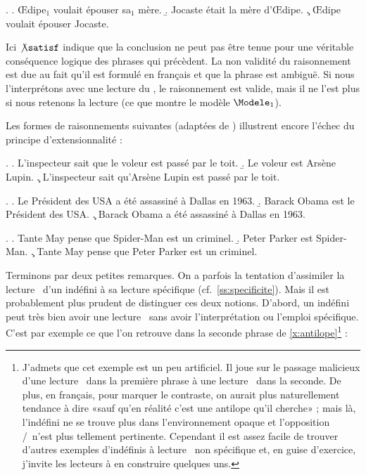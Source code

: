 \ex.
\a. \OE dipe$_1$  voulait épouser sa$_1$ mère.
\b. Jocaste était la mère d'\OE dipe.
\c. \juge{\small$\not\satisf\:$} \OE dipe voulait épouser Jocaste.

Ici $\not\satisf$ indique que la conclusion \Last[c] ne peut pas être tenue pour une véritable conséquence logique des phrases qui précèdent. 
La non validité du raisonnement est due au fait qu'il est formulé en français et que la phrase \Last[a] est ambiguë. Si nous l'interprétons avec une lecture  du {\GN} , le raisonnement est valide, mais il ne l'est plus si nous retenons la lecture  (ce que montre le modèle $\Modele_1$). 

Les formes de raisonnements suivantes (adaptées de \citealt{Gamut:2}) illustrent encore l'échec du principe d'extensionnalité : 



\ex.
\a. L'inspecteur {sait} que {le voleur}  est passé par le toit.
\b. Le voleur est Arsène Lupin.
\c. \juge{\small$\not\satisf\:$} L'inspecteur sait qu'Arsène Lupin est passé par le toit.


\ex. \label{x:O1963}
\a. Le Président des USA a été assassiné à Dallas en 1963.
\b. Barack Obama est le Président des USA.
\c. \juge{\small$\not\satisf\:$} Barack Obama a été assassiné à Dallas en 1963.

\ex.  \label{x:Spiderman}
\a. Tante May pense que Spider-Man est un criminel.
\b. Peter Parker est Spider-Man.
\c. \juge{\small$\not\satisf\:$} Tante May pense que Peter Parker est un criminel.


Terminons par deux petites remarques. On a parfois la tentation d'assimiler la lecture \dere\ d'un indéfini à sa lecture spécifique (cf.~\ref{ss:specificite}). Mais il est probablement plus prudent de distinguer ces deux notions. 
D'abord, un indéfini peut très bien avoir une lecture \dere\ sans avoir l'interprétation ou l'emploi spécifique.  C'est par exemple ce que l'on retrouve dans la seconde phrase de \ref{x:antilope}\footnote{J'admets que cet exemple est un peu artificiel. Il joue sur le passage malicieux d'une lecture \dedicto\ dans la première phrase à une lecture \dere\ dans la seconde. De plus, en français, pour marquer le contraste, on aurait plus naturellement tendance à dire «sauf qu'en réalité c'est une antilope  qu'il cherche» ; mais là, l'indéfini ne se trouve plus dans l'environnement opaque et l'opposition \dere/\dedicto\ n'est plus tellement pertinente. Cependant il est assez facile de trouver d'autres exemples d'indéfinis à lecture \dere\ non spécifique et, en guise d'exercice, j'invite les lecteurs à en construire quelques uns.} :

